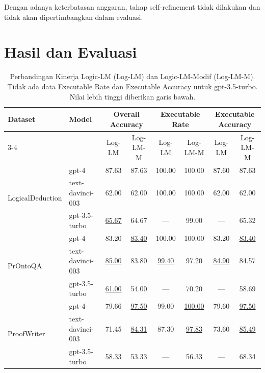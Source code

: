 \documentclass{easychair}
\begin{document}
Dengan adanya keterbatasan anggaran, tahap self-refinement tidak dilakukan dan tidak akan dipertimbangkan dalam evaluasi.

\section{Hasil dan Evaluasi}
\label{sect:evaluasi}

\begin{table}[tb]\small
\begin{center}
\begin{tabular}{llcccccc}
\hline
Dataset & Model 
& \multicolumn{2}{c}{Overall Accuracy}
& \multicolumn{2}{c}{Executable Rate}
& \multicolumn{2}{c}{Executable Accuracy} \\
\cline{3-4} \cline{5-6} \cline{7-8}

& 
& Log-LM & Log-LM-M
& Log-LM & Log-LM-M
& Log-LM & Log-LM-M \\
\hline

\multirow{3}{*}{LogicalDeduction}
& gpt-4            
& 87.63 & 87.63
& 100.00 & 100.00
& 87.60 & 87.63 \\

& text-davinci-003 
& 62.00 & 62.00
& 100.00   & 100.00
& 62.00 & 62.00 \\

& gpt-3.5-turbo    
& \underline{65.67} & 64.67
& --- & 99.00
& --- & 65.32 \\
\hline

\multirow{3}{*}{PrOntoQA}
& gpt-4            
& 83.20 & \underline{83.40}
& 100.00 & 100.00
& 83.20 & \underline{83.40} \\

& text-davinci-003 
& \underline{85.00} & 83.80
& \underline{99.40}   & 97.20
& \underline{84.90}   & 84.57 \\

& gpt-3.5-turbo    
& \underline{61.00} & 54.00
& --- & 70.20
& --- & 58.69 \\
\hline

\multirow{3}{*}{ProofWriter} 
& gpt-4            
& 79.66 & \underline{97.50}
& 99.00 & \underline{100.00}
& 79.60 & \underline{97.50} \\

& text-davinci-003 
& 71.45 & \underline{84.31}
& 87.30   & \underline{97.83}
& 73.60   & \underline{85.49} \\

& gpt-3.5-turbo    
& \underline{58.33} & 53.33
& --- & 56.33
& --- & 68.34 \\

\hline
\end{tabular}
\end{center}
\caption{Perbandingan Kinerja Logic-LM (Log-LM) dan Logic-LM-Modif (Log-LM-M). Tidak ada data Executable Rate dan Executable Accuracy untuk gpt-3.5-turbo. Nilai lebih tinggi diberikan garis bawah.}
\label{tab:results}
\end{table}
\end{document}
